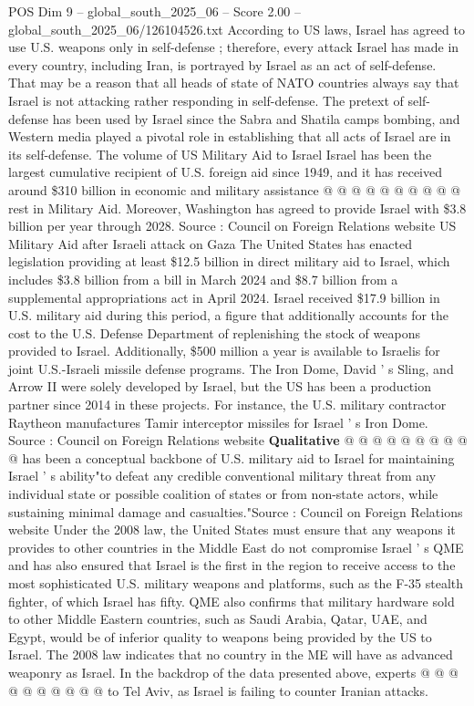 \begin{textsample}{POS Dim 9 – global\_south\_2025\_06 – Score 2.00 – global\_south\_2025\_06/126104526.txt}
According to US laws, Israel has agreed to use U.S. weapons only in self-defense ; therefore, every attack Israel has made in every country, including Iran, is portrayed by Israel as an act of self-defense.
That may be a reason that all heads of state of NATO countries always say that Israel is not attacking rather responding in self-defense.
The pretext of self-defense has been used by Israel since the Sabra and Shatila camps bombing, and Western media played a pivotal role in establishing that all acts of Israel are in its self-defense.
The volume of US Military Aid to Israel Israel has been the largest cumulative recipient of U.S. foreign aid since 1949, and it has received around \$310 billion in economic and military assistance @ @ @ @ @ @ @ @ @ @ rest in Military Aid.
Moreover, Washington has agreed to provide Israel with \$3.8 billion per year through 2028.
Source : Council on Foreign Relations website US Military Aid after Israeli attack on Gaza The United States has enacted legislation providing at least \$12.5 billion in direct military aid to Israel, which includes \$3.8 billion from a bill in March 2024 and \$8.7 billion from a supplemental appropriations act in April 2024.
Israel received \$17.9 billion in U.S. military aid during this period, a figure that additionally accounts for the cost to the U.S.
Defense Department of replenishing the stock of weapons provided to Israel.
Additionally, \$500 million a year is available to Israelis for joint U.S.-Israeli missile defense programs.
The Iron Dome, David ' s Sling, and Arrow II were solely developed by Israel, but the US has been a production partner since 2014 in these projects.
For instance, the U.S. military contractor Raytheon manufactures Tamir interceptor missiles for Israel ' s Iron Dome.
Source : Council on Foreign Relations website \textbf{Qualitative} @ @ @ @ @ @ @ @ @ @ has been a conceptual backbone of U.S. military aid to Israel for maintaining Israel ' s ability"to defeat any credible conventional military threat from any individual state or possible coalition of states or from non-state actors, while sustaining minimal damage and casualties."Source : Council on Foreign Relations website Under the 2008 law, the United States must ensure that any weapons it provides to other countries in the Middle East do not compromise Israel ' s QME and has also ensured that Israel is the first in the region to receive access to the most sophisticated U.S. military weapons and platforms, such as the F-35 stealth fighter, of which Israel has fifty.
QME also confirms that military hardware sold to other Middle Eastern countries, such as Saudi Arabia, Qatar, UAE, and Egypt, would be of inferior quality to weapons being provided by the US to Israel.
The 2008 law indicates that no country in the ME will have as advanced weaponry as Israel.
In the backdrop of the data presented above, experts @ @ @ @ @ @ @ @ @ @ to Tel Aviv, as Israel is failing to counter Iranian attacks.

\end{textsample}
